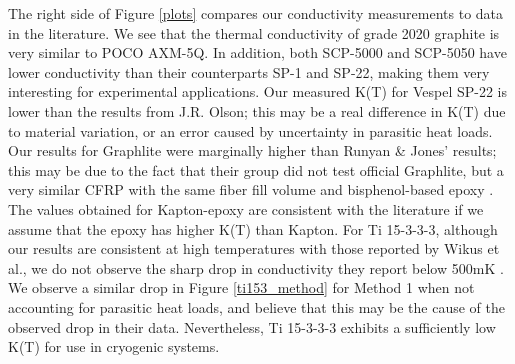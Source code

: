 \documentclass[final]{svjour2}
\begin{document}
The right side of Figure \ref{plots} compares our conductivity measurements to data in the literature. We see that the thermal conductivity of grade 2020 graphite is very similar to POCO AXM-5Q. In addition, both SCP-5000 and SCP-5050 have lower conductivity than their counterparts SP-1 and SP-22, making them very interesting for experimental applications. Our measured K(T) for Vespel SP-22 is lower than the results from J.R. Olson\cite{Olson1993}; this may be a real difference in K(T) due to material variation, or an error caused by uncertainty in parasitic heat loads. Our results for Graphlite were marginally higher than Runyan \& Jones' results\cite{Runyan2008}; this may be due to the fact that their group did not test official Graphlite, but a very similar CFRP with the same fiber fill volume and bisphenol-based epoxy \footnotemark {}.  The values obtained for Kapton-epoxy are consistent with the literature if we assume that the epoxy has higher K(T) than Kapton. For Ti 15-3-3-3, although our results are consistent at high temperatures with those reported by Wikus et al.\cite{Wikus2010}, we do not observe the sharp drop in conductivity they report below 500mK \footnotemark.  We observe a similar drop in Figure \ref{ti153_method} for Method 1 when not accounting for parasitic heat loads, and believe that this may be the cause of the observed drop in their data. Nevertheless, Ti 15-3-3-3 exhibits a sufficiently low K(T) for use in cryogenic systems.
\end{document}
